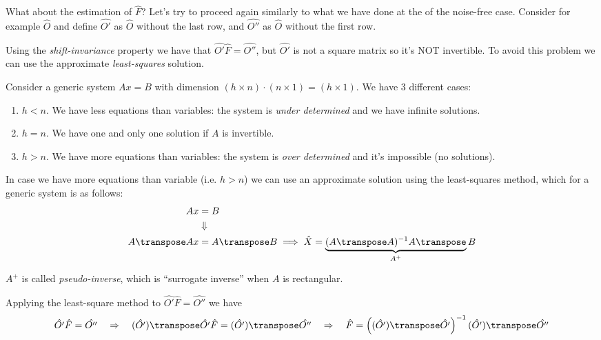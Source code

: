 What about the estimation of $\hat{F}$? Let's try to proceed again similarly to what we have done at the  of the noise-free case.
Consider for example $\hat{O}$ and define $\hat{O'}$ as $\hat{O}$ without the last row, and $\hat{O''}$ as $\hat{O}$ without the first row.

Using the \emph{shift-invariance} property we have that $\hat{O'} \hat{F} = \hat{O''}$, but $\hat{O'}$ is not a square matrix so it's NOT invertible.
To avoid this problem we can use the approximate \emph{least-squares} solution.


\begin{rem}
    Consider a generic system $Ax = B$ with dimension  $(h\times n) \cdot (n \times 1) = (h \times 1)$. We have 3 different cases:
    \begin{enumerate}
        \item $h < n$. We have less equations than variables: the system is \emph{under determined} and we have infinite solutions.
        \item $h = n$. We have one and only one solution if $A$ is invertible.
        \item $h > n$. We have more equations than variables: the system is \emph{over determined} and it's impossible (no solutions).
    \end{enumerate}
\end{rem}

\begin{rem}
    In case we have more equations than variable (i.e. $h>n$) we can use an approximate solution using the least-squares method, which for a generic system is as follows:
    \begin{align*}
        Ax &= B \\
           &\Downarrow\\
        A\transpose A x &= A\transpose B \implies \hat{X} = \underbrace{(A\transpose A)^{-1}A\transpose}_{A^+} B
    \end{align*}
    
    $A^+$ is called \emph{pseudo-inverse}, which is ``surrogate inverse'' when $A$ is rectangular.
\end{rem}


Applying the least-square method to $\hat{O'} \hat{F} = \hat{O''}$ we have
\begin{align*}
    \hat{O'}\hat{F} = \hat{O''} \quad \Rightarrow \quad
    (\hat{O'})\transpose\hat{O'}\hat{F} = (\hat{O'})\transpose\hat{O''} \quad \Rightarrow \quad 
    \hat{F} = \left((\hat{O'})\transpose\hat{O'}\right)^{-1} (\hat{O'})\transpose\hat{O''}
\end{align*}


